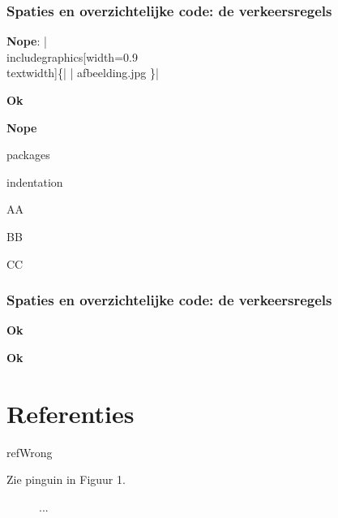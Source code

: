 \documentclass{cursuspresentatie}
\begin{document}
\begin{frame}
	\frametitle{Spaties en overzichtelijke code: de verkeersregels}

	\textbf{\textcolor{darkpastelred}{Nope}}: \hll|\\includegraphics[width=0.9\\textwidth]\{| \hll| afbeelding.jpg \}|
	\medskip

	\textbf{\textcolor{darkpastelgreen}{Ok}}
	\medskip

	\textbf{\textcolor{darkpastelred}{Nope}}
\end{frame}

\begin{saveblock}{packages}
	\begin{highlightblock}
		\usepackage{
			parskip,
			hyperref
		}
	\end{highlightblock}
\end{saveblock}

\begin{saveblock}{indentation}
	\begin{highlightblock}
		\begin{center}
			AA
		\end{center}
		\begin{center}
		BB
		\end{center}
		\begin{center}CC\end{center}
	\end{highlightblock}
\end{saveblock}


\begin{frame}
	\frametitle{Spaties en overzichtelijke code: de verkeersregels}

	\textbf{\textcolor{darkpastelgreen}{Ok}}
	\medskip

	\textbf{\textcolor{darkpastelgreen}{Ok}}
\end{frame}
	
\section{Referenties}

\begin{saveblock}{refWrong}
	\begin{highlightblock}[gobble=8,linewidth=\textwidth,
		framexleftmargin=0.25em,xleftmargin=0.25em]
		Zie pinguin in Figuur 1.
		\begin{figure} %
			... %
		\end{figure}
	\end{highlightblock}
\end{saveblock}
\end{document}
